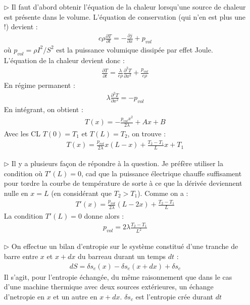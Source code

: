 \documentclass{report}
\begin{document}
\begin{itemize}

	\item[$\triangleright$] Il faut d'abord obtenir l'équation de la chaleur lorsqu'une source de chaleur est présente dans le volume. L'équation de conservation (qui n'en est plus une !) devient :
	\begin{align*}
		c\rho\frac{\partial T}{\partial t} = -\frac{\partial j}{\partial x} + p_{vol}
	\end{align*}
	où $p_{vol} = \rho I^2/S^2$ est la puissance volumique dissipée par effet Joule. 
	L'équation de la chaleur devient donc :
	\begin{align*}
		\frac{\partial T}{\partial t} = \frac{\lambda}{c\rho}\frac{\partial^2 T}{\partial x^2} + \frac{p_{vol}}{c\rho}
	\end{align*}	
	En régime permanent :
	\begin{align*}
	  \lambda\frac{\partial^2 T}{\partial x^2} = - p_{vol}
	\end{align*}	
	En intégrant, on obtient :
	\begin{align*}
		T(x) = -\frac{p_{vol}x^2}{2\lambda}+Ax+B
	\end{align*}
	Avec les CL $T(0)=T_1$ et $T(L)=T_2$, on trouve :
	\begin{align*}
		T(x) = \frac{p_{vol}}{2\lambda}x(L-x)+\frac{T_2-T_1}{L}x+T_1
	\end{align*}
	\item[$\triangleright$] Il y a plusieurs façon de répondre à la question. Je préfère utiliser la condition où $T'(L)=0$, cad que la puissance électrique chauffe suffisament pour tordre la courbe de température de sorte à ce que la dérivée deviennent nulle en $x=L$ (en considérant que $T_2>T_1$).
	Comme on a :
	\begin{align*}
		T'(x) = \frac{p_{vol}}{2\lambda}(L-2x)+\frac{T_2-T_1}{L}
	\end{align*}
	La condition $T'(L)=0$ donne alors : 
	\begin{align*}
		p_{vol} = 2\lambda\frac{T_2-T_1}{L^2}
	\end{align*}
	
	\item[$\triangleright$] On effectue un bilan d'entropie sur le système constitué d'une tranche de barre entre $x$ et $x+dx$ du barreau durant un temps $dt$ :
	\begin{align*}
		dS = \delta s_e(x) - \delta s_e(x+dx) +\delta s_c
	\end{align*}
Il s'agit, pour l'entropie échangée, du même raisonnement que dans le cas d'une machine thermique avec deux sources extérieures, un échange d'netropie en $x$ et un autre en $x+dx$. $\delta s_c$ est l'entropie crée durant $dt$


\end{itemize}
\end{document}
